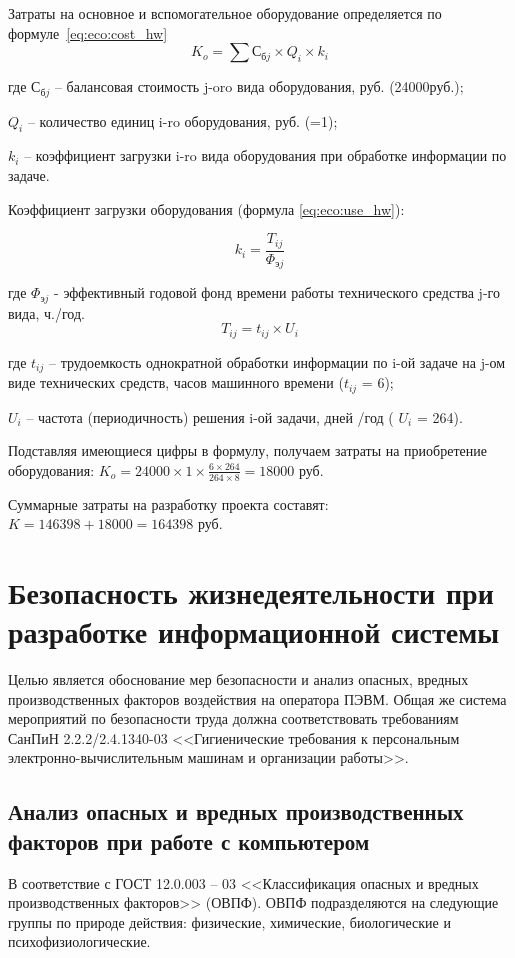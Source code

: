 \documentclass[utf8,usehyperref,12pt]{G7-32}
\begin{document}
Затраты на основное и вспомогательное оборудование определяется по формуле~\ref{eq:eco:cost_hw}
\begin{equation}
  \label{eq:eco:cost_hw}
  K_o = \sum С_{бj} \times Q_i \times k_i
\end{equation}

где $С_{бj}$ – балансовая стоимость j-oro вида оборудования, руб. (24000руб.);

$Q_i$ – количество единиц i-ro оборудования, руб. (=1);

$k_i$ – коэффициент загрузки i-ro вида оборудования при обработке информации по задаче.

Коэффициент загрузки оборудования (формула \ref{eq:eco:use_hw}):

\begin{equation}
  \label{eq:eco:use_hw}
  k_i = \frac{T_{ij}}{\Phi_{эj}}
\end{equation}

где $\Phi_{эj}$ - эффективный годовой фонд времени работы технического средства j-го вида, ч./год.
\begin{equation}
  \label{eq:eco:use_hw_t}
  T_{ij} = t_{ij} \times U_i
\end{equation}

где $t_{ij}$ – трудоемкость однократной обработки информации по i-ой задаче на j-ом виде технических средств, часов машинного времени ($t_{ij}$ = 6);

$U_i$ – частота (периодичность) решения i-ой задачи, дней /год ( $U_i$ = 264).

Подставляя имеющиеся цифры в формулу, получаем затраты на приобретение оборудования:
$K_o = 24000 \times 1 \times \frac{6 \times 264}{264 \times 8} = 18000$ руб.

Суммарные затраты на разработку проекта составят:
$K = 146398 + 18000 = 164398$ руб.

\chapter{Безопасность жизнедеятельности при разработке информационной системы}
Целью является обоснование мер безопасности и анализ опасных, вредных производственных факторов воздействия на оператора ПЭВМ.
Общая же система мероприятий по безопасности труда должна соответствовать требованиям СанПиН 2.2.2/2.4.1340-03 <<Гигиенические требования к персональным электронно-вычислительным машинам и организации работы>>. 

\section{Анализ опасных и вредных производственных факторов при работе с компьютером}
\label{safety_analysis}
В соответствие с ГОСТ 12.0.003 – 03 <<Классификация опасных и вредных производственных факторов>> (ОВПФ)\cite{gost_12.0.003-03}. ОВПФ подразделяются на следующие группы по природе действия: физические, химические, биологические и психофизиологические.
\end{document}
